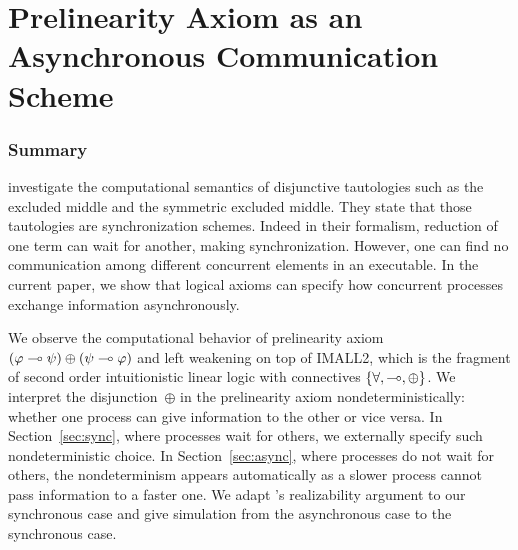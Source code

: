 \chapter{Prelinearity Axiom as an Asynchronous Communication Scheme}




% 



\subsection{Summary}
\citet{danos-krivine} investigate
the computational semantics of disjunctive tautologies
such as the excluded middle and the symmetric excluded middle.
They state that those tautologies are synchronization schemes.
Indeed in their formalism, reduction of one term can wait
for another, making synchronization.
However,
one can find no communication among different
concurrent elements in an executable.
In the current paper, we show that logical axioms can specify how
concurrent processes exchange information asynchronously.

We observe the computational behavior of prelinearity axiom
$(\varphi\multimap\psi)\oplus(\psi\multimap\varphi)$ and left weakening
on top of IMALL2, which is the fragment of second order
intuitionistic linear logic with connectives $\{\forall, \multimap,
\oplus\}$.
We interpret the disjunction~$\oplus$ in the prelinearity axiom
nondeterministically: whether
one process can give information to the other or
vice versa.
In Section~\ref{sec:sync}, where processes wait for others,
we externally specify such nondeterministic choice.
In Section~\ref{sec:async}, where processes do not wait for others,
the nondeterminism appears automatically as a slower process cannot pass
information to a faster one.
We adapt \citet{danos-krivine}'s realizability argument to our
synchronous case and give simulation from the
asynchronous case to the synchronous case.

